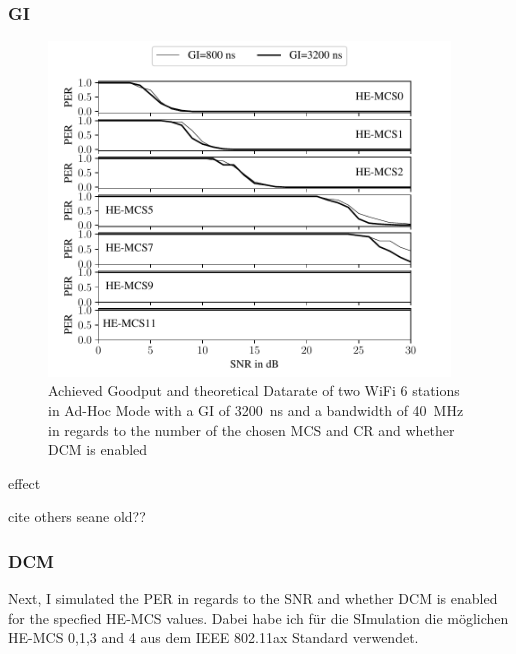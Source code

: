\subsubsection*{\acf{GI}}
\begin{figure}%
	\centering
	\includegraphics[width=0.95\textwidth]{figures/GI_PER_to_SNR.pdf}
	\caption{Achieved Goodput and theoretical Datarate of two WiFi 6 stations in Ad-Hoc Mode with a \ac{GI} of \SI{3200}{\nano\second} and a bandwidth of \SI{40}{\mega\hertz} in regards to the number of the chosen \ac{MCS} and \ac{CR} and whether \ac{DCM} is enabled}%
	\label{fig:PER_SNR_GI}%
\end{figure}
\cite{patil} effect

cite others seane old??



\subsubsection*{\acf{DCM}}
Next, I simulated the \ac{PER} in regards to the \ac{SNR}  and whether \ac{DCM} is enabled for the specfied HE-\ac{MCS} values. Dabei habe ich für die SImulation die möglichen
HE-MCS \num{0},\num{1},\num{3} and \num{4} aus dem IEEE 802.11ax Standard verwendet.


